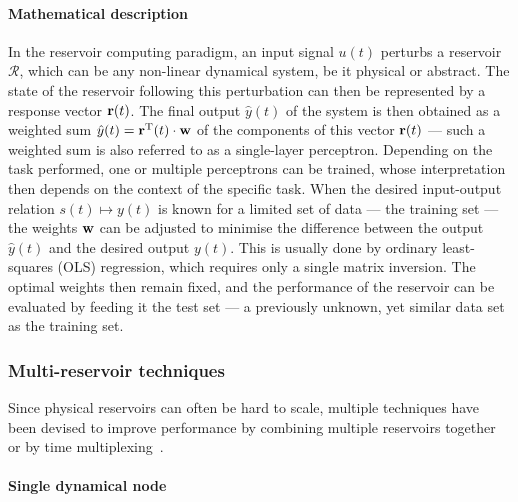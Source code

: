 \paragraph{Mathematical description}
In the reservoir computing paradigm, an input signal $u(t)$ perturbs a reservoir $\mathcal{R}$, which can be any non-linear dynamical system, be it physical or abstract.
The state of the reservoir following this perturbation can then be represented by a response vector $\boldsymbol{\mathbf{r}}(t)$.
The final output $\hat{y}(t)$ of the system is then obtained as a weighted sum $\hat{y}(t) = \boldsymbol{\mathbf{r}}^\mathrm{T}(t) \cdot \boldsymbol{\mathbf{w}}$ of the components of this vector $\boldsymbol{\mathbf{r}}(t)$ --- such a weighted sum is also referred to as a single-layer perceptron.
Depending on the task performed, one or multiple perceptrons can be trained, whose interpretation then depends on the context of the specific task.
When the desired input-output relation $s(t) \mapsto y(t)$ is known for a limited set of data --- the training set --- the weights $\boldsymbol{\mathbf{w}}$ can be adjusted to minimise the difference between the output $\hat{y}(t)$ and the desired output $y(t)$.
This is usually done by ordinary least-squares (OLS) regression, which requires only a single matrix inversion.
The optimal weights then remain fixed, and the performance of the reservoir can be evaluated by feeding it the test set --- a previously unknown, yet similar data set as the training set.


\subsubsection{Multi-reservoir techniques}
Since physical reservoirs can often be hard to scale, multiple techniques have been devised to improve performance by combining multiple reservoirs together~\cite{EvaluatingRestrictedESNs,RotatingNeuronsRC} or by time multiplexing~\cite{appeltant2011information}.
\paragraph{Single dynamical node}
\cite{appeltant2011information}
